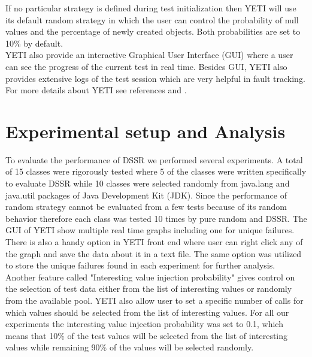 \documentclass[10pt, conference, compsocconf]{IEEEtran}
\begin{document}
If no particular strategy is defined during test initialization then YETI will use its default random strategy in which the user can control the probability of null values and the percentage of newly created objects. Both probabilities are set to 10\% by default. \\

YETI also provide an interactive Graphical User Interface (GUI) where a user can see the progress of the current test in real time. Besides GUI, YETI also provides extensive logs of the test session which are very helpful in fault tracking. For more details about YETI see references \cite{Oriol2010a} and \cite{Oriol2010}.

\section{Experimental setup and Analysis}\label{sec:experimentalsetup}
To evaluate the performance of DSSR we performed several experiments. A total of 15 classes were rigorously tested where 5 of the classes were written specifically to evaluate DSSR while 10 classes were selected randomly from java.lang and java.util packages of Java Development Kit (JDK). Since the performance of random strategy cannot be evaluated from a few tests because of its random behavior therefore each class was tested 10 times by pure random and DSSR. The GUI of YETI show multiple real time graphs including one for unique failures. There is also a handy option in YETI front end where user can right click any of the graph and save the data about it in a text file. The same option was utilized to store the unique failures found in each experiment for further analysis. Another feature called "Interesting value injection probability" gives control on the selection of test data either from the list of interesting values or randomly from the available pool. YETI also allow user to set a specific number of calls for which values should be selected from the list of interesting values. For all our experiments the interesting value injection probability was set to 0.1, which means that 10\% of the test values will be selected from the list of interesting values while remaining 90\% of the values will be selected randomly.\\
\end{document}

